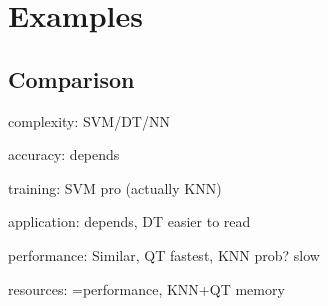 \chapter{Examples}







\section{Comparison}
complexity: SVM/DT/NN

accuracy: depends

training: SVM pro (actually KNN)

application: depends, DT easier to read

performance: Similar, QT fastest, KNN prob? slow

resources: =performance, KNN+QT memory